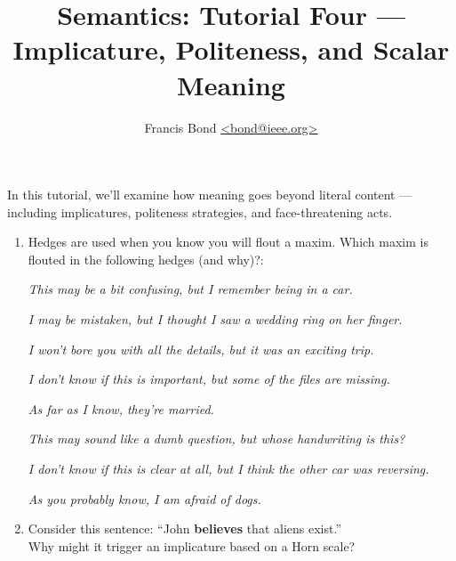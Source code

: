 \documentclass[a4paper]{article}
\title{Semantics: Tutorial Four — Implicature, Politeness, and Scalar Meaning}
\author{Francis Bond \url{<bond@ieee.org>}}
\date{}%
\begin{document}
\maketitle

\noindent In this tutorial, we'll examine how meaning goes beyond literal content — including implicatures, politeness strategies, and face-threatening acts.

\begin{enumerate}
\item Hedges are used when you know you will flout a maxim.  Which
  maxim is flouted in the following hedges (and why)?:

\begin{exe}

\ex \textit{This may be a bit confusing, but I remember being in a car.}

\ex \textit{I may be mistaken, but I thought I saw a wedding ring on her finger.}


\ex \textit{I won't bore you with all the details, but it was an exciting trip.}


\ex \textit{I don't know if this is important, but some of the files are missing.}

\ex \textit{As far as I know, they're married.}

\ex \textit{This may sound like a dumb question, but whose handwriting is this?}


\ex \textit{I don't know if this is clear at all, but I think the other car was reversing.}

\ex \textit{As you probably know, I am afraid of dogs.}
\end{exe}
\item Consider this sentence: “John \textbf{believes} that aliens exist.”  
\\ Why might it trigger an implicature based on a Horn scale?


\end{enumerate}
\end{document}
